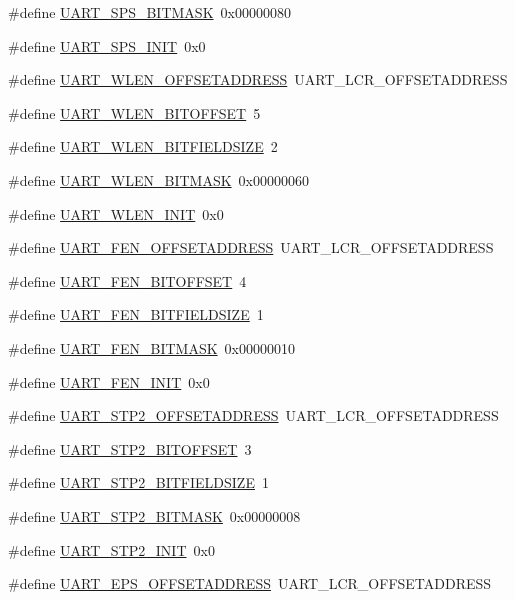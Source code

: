 \begin{DoxyCompactItemize}
\item 
\#define \hyperlink{a00575_a4a17f50bfb0d3892542c422ab25327f4}{UART\_\-SPS\_\-BITMASK}~0x00000080
\item 
\#define \hyperlink{a00575_aad331dbe8199d67ee98dfdd06aba9bd1}{UART\_\-SPS\_\-INIT}~0x0
\item 
\#define \hyperlink{a00575_a594d5143448a77701c565aed6b888e8f}{UART\_\-WLEN\_\-OFFSETADDRESS}~UART\_\-LCR\_\-OFFSETADDRESS
\item 
\#define \hyperlink{a00575_a5100b255345fca628e8738973a0cba60}{UART\_\-WLEN\_\-BITOFFSET}~5
\item 
\#define \hyperlink{a00575_ac7c6de9a45f8c95d3a74cc4f9e14aaab}{UART\_\-WLEN\_\-BITFIELDSIZE}~2
\item 
\#define \hyperlink{a00575_ae73bcb260ab7a0a9c5acae575ffd652f}{UART\_\-WLEN\_\-BITMASK}~0x00000060
\item 
\#define \hyperlink{a00575_aec1e9143b91025a24478022570ff8547}{UART\_\-WLEN\_\-INIT}~0x0
\item 
\#define \hyperlink{a00575_afe672cd947a3bce438b8e5931f7016ef}{UART\_\-FEN\_\-OFFSETADDRESS}~UART\_\-LCR\_\-OFFSETADDRESS
\item 
\#define \hyperlink{a00575_afc3ed8faf3d384645379ad2f5c241cd7}{UART\_\-FEN\_\-BITOFFSET}~4
\item 
\#define \hyperlink{a00575_a78a47af3260117e18c3ac46a896b67d6}{UART\_\-FEN\_\-BITFIELDSIZE}~1
\item 
\#define \hyperlink{a00575_a2e18c386f4911d40d9cfb234990fda33}{UART\_\-FEN\_\-BITMASK}~0x00000010
\item 
\#define \hyperlink{a00575_a0c9cb0d76c48f65d4e55248ebcbc7ac3}{UART\_\-FEN\_\-INIT}~0x0
\item 
\#define \hyperlink{a00575_a47ee26ec19c2ef9f634a215ad46175f2}{UART\_\-STP2\_\-OFFSETADDRESS}~UART\_\-LCR\_\-OFFSETADDRESS
\item 
\#define \hyperlink{a00575_a5b701bc961d26890f60716eef3941c2f}{UART\_\-STP2\_\-BITOFFSET}~3
\item 
\#define \hyperlink{a00575_a00b092f3c050d58f442ea44500329729}{UART\_\-STP2\_\-BITFIELDSIZE}~1
\item 
\#define \hyperlink{a00575_a1744100a2771c5a1375d58271d563436}{UART\_\-STP2\_\-BITMASK}~0x00000008
\item 
\#define \hyperlink{a00575_a1aabaa11cd58fd0267a17241387e5d6e}{UART\_\-STP2\_\-INIT}~0x0
\item 
\#define \hyperlink{a00575_a8c9c1d92586929438b0e6a29f0c33543}{UART\_\-EPS\_\-OFFSETADDRESS}~UART\_\-LCR\_\-OFFSETADDRESS

\end{DoxyCompactItemize}
